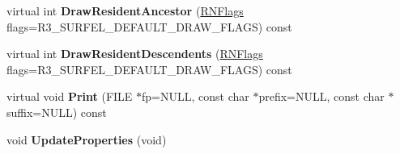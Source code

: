 \begin{DoxyCompactItemize}
\item 
virtual int {\bfseries Draw\+Resident\+Ancestor} (\hyperlink{class_r_n_flags}{R\+N\+Flags} flags=R3\+\_\+\+S\+U\+R\+F\+E\+L\+\_\+\+D\+E\+F\+A\+U\+L\+T\+\_\+\+D\+R\+A\+W\+\_\+\+F\+L\+A\+GS) const \hypertarget{class_r3_surfel_node_a76dd48b89f593bed9e7d5a1e47387397}{}\label{class_r3_surfel_node_a76dd48b89f593bed9e7d5a1e47387397}

\item 
virtual int {\bfseries Draw\+Resident\+Descendents} (\hyperlink{class_r_n_flags}{R\+N\+Flags} flags=R3\+\_\+\+S\+U\+R\+F\+E\+L\+\_\+\+D\+E\+F\+A\+U\+L\+T\+\_\+\+D\+R\+A\+W\+\_\+\+F\+L\+A\+GS) const \hypertarget{class_r3_surfel_node_a9c525e257538d8c88d4b95819e99e995}{}\label{class_r3_surfel_node_a9c525e257538d8c88d4b95819e99e995}

\item 
virtual void {\bfseries Print} (F\+I\+LE $\ast$fp=N\+U\+LL, const char $\ast$prefix=N\+U\+LL, const char $\ast$suffix=N\+U\+LL) const \hypertarget{class_r3_surfel_node_ae43a1498e623c058f0ab4c9f74efcc71}{}\label{class_r3_surfel_node_ae43a1498e623c058f0ab4c9f74efcc71}

\item 
void {\bfseries Update\+Properties} (void)\hypertarget{class_r3_surfel_node_aea3ba4720ac1357ca7f1da2664244e87}{}\label{class_r3_surfel_node_aea3ba4720ac1357ca7f1da2664244e87}

\end{DoxyCompactItemize}

